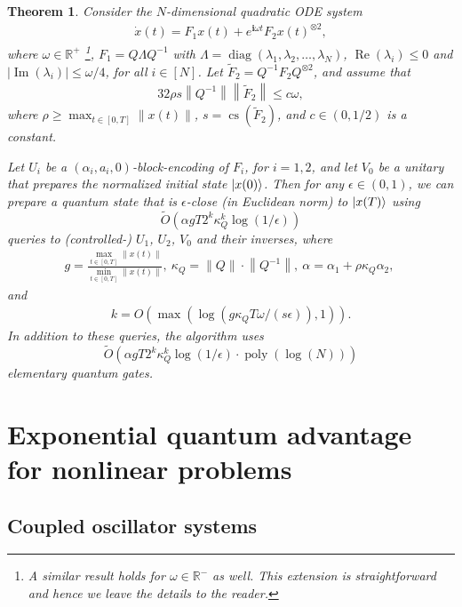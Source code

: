 \documentclass[10pt,a4paper]{amsart}
\theoremstyle{plain}
\newtheorem{thm}{Theorem}
\theoremstyle{definition}
\theoremstyle{remark}
\newcommand{\abs}[1]      {\left| #1 \right|}
\newcommand{\norm}[1]     {\left\| #1 \right\|}
\newcommand{\ot}{\otimes}
\newcommand{\lrb}[1]{\left ( #1 \right )}
\newcommand{\diag}[1]{\operatorname{diag}\lrb{#1}}
\newcommand{\realpart}[1]{\operatorname{Re}\lrb{#1}}
\newcommand{\imaginarypart}[1]{\operatorname{Im}\lrb{#1}}
\newcommand{\mypoly}[1]{\operatorname{poly} \lrb{#1}}
\newcommand{\mylog}[1]{\operatorname{log} \lrb{#1}}
\newcommand{\myO}[1]{O\lrb{#1}}
\newcommand{\mytO}[1]{\tilde{O}\lrb{#1}}
\renewcommand{\i}{\ensuremath{\mathbf{i}}}
\newcommand{\R}{\mathbb{R}}
\begin{document}
\begin{thm}
Consider the $N$-dimensional quadratic ODE system
\begin{align}
    \dot{x}(t) = F_1 x(t) + e^{\i \omega t}F_2 x(t)^{\ot 2},
\end{align}
where $\omega \in \R^+$ \footnote{A similar result holds for $\omega \in \R^-$ as well. This extension is straightforward and hence we leave the details to the reader.}, 
$F_1=Q\Lambda Q^{-1}$ with $\Lambda=\diag{\lambda_1, \lambda_2, \dots, \lambda_N}$, $\realpart{\lambda_i} \le 0$ and $\abs{\imaginarypart{\lambda_i}} \le \omega/4$, for all $i \in [N]$. Let $\tilde{F}_2=Q^{-1}F_2Q^{\otimes 2}$, and assume that
\begin{align}
32\rho s \norm{Q^{-1}} \norm{\tilde{F}_2} \le c\omega,    
\end{align}
where $\rho \ge \max_{t \in [0, T]} \norm{x(t)}$, $s=\operatorname{cs}(\tilde{F}_2)$, and 
$c \in (0,1/2)$ is a constant.

Let $U_i$ be a $(\alpha_i, a_i, 0)$-block-encoding of $F_i$, for $i=1,2$, and let $V_0$ be a unitary that prepares the normalized initial state $\ket{x(0)}$. Then for any $\epsilon \in (0, 1)$, we can prepare a quantum state that is $\epsilon$-close (in Euclidean norm) to $\ket{x(T)}$ using 
$$\mytO{\alpha g T  2^k \kappa_Q^k\mylog{1/\epsilon}}$$
queries to (controlled-) $U_1$, $U_2$, $V_0$ and their inverses, where 
\begin{align}
g=\frac{\max_{t \in [0, T]} {\norm{x(t)}}}{\min_{t \in [0, T]} {\norm{x(t)}}},~
\kappa_Q=\norm{Q}\cdot \norm{Q^{-1}},~
\alpha=\alpha_1+{\rho\kappa_Q\alpha_2},~ 
\end{align} 
and
\begin{align}
k=\myO{\max(\mylog{ g  \kappa_Q T\omega/(s\epsilon)}, 1)}.    
\end{align}
In addition to these queries, the algorithm uses
$$\mytO{\alpha g T 2^k \kappa_Q^k \mylog{1/\epsilon}\cdot \mypoly{\mylog{N}}}$$
elementary quantum gates.
\label{thm:algorithm_complexity_time_dependent_f2_case}
\end{thm}

\section{Exponential quantum advantage for nonlinear problems}

\subsection{Coupled oscillator systems}
\label{subsec:coupled_oscillators}
\end{document}
